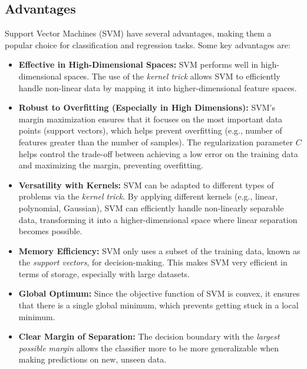 \subsection{Advantages}
\label{subsec:advantages-svm}

Support Vector Machines (SVM) have several advantages, making them a popular choice for classification and regression tasks.
Some key advantages are:

\begin{itemize}
    \item \textbf{Effective in High-Dimensional Spaces:} SVM performs well in high-dimensional spaces. The use of the \textit{kernel trick} allows SVM to efficiently handle non-linear data by mapping it into higher-dimensional feature spaces.

    \item \textbf{Robust to Overfitting (Especially in High Dimensions):} SVM's margin maximization ensures that it focuses on the most important data points (support vectors), which helps prevent overfitting (e.g., number of features greater than the number of samples). The regularization parameter $C$ helps control the trade-off between achieving a low error on the training data and maximizing the margin, preventing overfitting.

    \item \textbf{Versatility with Kernels:} SVM can be adapted to different types of problems via the \textit{kernel trick}.
    By applying different kernels (e.g., linear, polynomial, Gaussian), SVM can efficiently handle non-linearly separable data, transforming it into a higher-dimensional space where linear separation becomes possible.

    \item \textbf{Memory Efficiency:} SVM only uses a subset of the training data, known as the \textit{support vectors}, for decision-making.
    This makes SVM very efficient in terms of storage, especially with large datasets.

    \item \textbf{Global Optimum:} Since the objective function of SVM is convex, it ensures that there is a single global minimum, which prevents getting stuck in a local minimum.

    \item \textbf{Clear Margin of Separation:} The decision boundary with the \textit{largest possible margin} allows the classifier more to be more generalizable when making predictions on new, unseen data.


\end{itemize}
